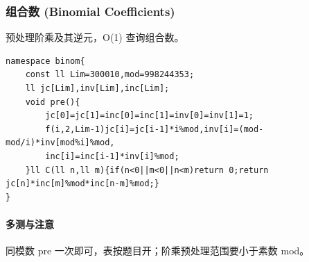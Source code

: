 \subsubsection{组合数 (Binomial Coefficients)}
预处理阶乘及其逆元，O(1) 查询组合数。
\begin{lstlisting}
namespace binom{
	const ll Lim=300010,mod=998244353;
	ll jc[Lim],inv[Lim],inc[Lim];
	void pre(){
		jc[0]=jc[1]=inc[0]=inc[1]=inv[0]=inv[1]=1;
		f(i,2,Lim-1)jc[i]=jc[i-1]*i%mod,inv[i]=(mod-mod/i)*inv[mod%i]%mod,
		inc[i]=inc[i-1]*inv[i]%mod;
	}ll C(ll n,ll m){if(n<0||m<0||n<m)return 0;return jc[n]*inc[m]%mod*inc[n-m]%mod;}
}
\end{lstlisting}

\paragraph{多测与注意} 同模数 pre 一次即可，表按题目开；阶乘预处理范围要小于素数 mod。
